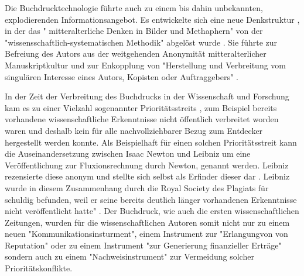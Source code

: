 Die Buchdrucktechnologie führte auch zu einem bis dahin unbekannten, explodierenden Informationsangebot. Es entwickelte sich eine neue Denkstruktur \cite{eisenstein_1997_druckerpresse}, in der das " mitteralterliche Denken in Bilder und Methaphern" von der "wissensschaftlich-systematischen Methodik" abgelöst wurde \cite{wunderlich_2008_buchdruck}. Sie führte zur Befreiung des Autors aus der weitgehenden Anonymität mitteralterlicher Manuskriptkultur und zur Enkopplung von "Herstellung und Verbreitung vom singulären Interesse eines Autors, Kopisten oder Auftraggebers"\cite{wunderlich_2008_buchdruck} \cite{schirmbacher_2009_wisspub}.

In der Zeit der Verbreitung des Buchdrucks in der Wissenschaft und Forschung kam es zu einer Vielzahl sogenannter Prioritätsstreits \cite{schirmbacher_2009_wisspub}, zum Beispiel bereits vorhandene wissenschaftliche Erkenntnisse nicht öffentlich verbreitet worden waren und deshalb kein für alle nachvollziehbarer Bezug zum Entdecker hergestellt werden konnte. Als Beispielhaft für einen solchen Prioritätsstreit kann die Auseinandersetzung zwischen Isaac Newton und Leibniz um eine Veröffentlichung zur Fluxionsrechnung durch Newton, genannt werden. Leibniz rezensierte diese anonym und stellte sich selbst als Erfinder dieser dar \cite{2013_leibniz}. Leibniz wurde in diesem Zusammenhang durch die Royal Society des Plagiats für schuldig befunden, weil er seine bereits deutlich länger vorhandenen Erkenntnisse nicht veröffentlicht hatte" \cite{schirmbacher_2009_wisspub}. Der Buchdruck, wie auch die ersten wissenschaftlichen Zeitungen, wurden für die wissenschaftlichen Autoren somit nicht nur zu einem neuen "Kommunikationsinsturment", einem Instrument zur "Erlangungvon von Reputation" oder zu einem Instrument "zur Generierung finanzieller Erträge" sondern auch zu einem "Nachweisinstrument" \cite{wunderlich_2008_buchdruck} \cite{schirmbacher_2009_wisspub} zur Vermeidung solcher Prioritätskonflikte.


